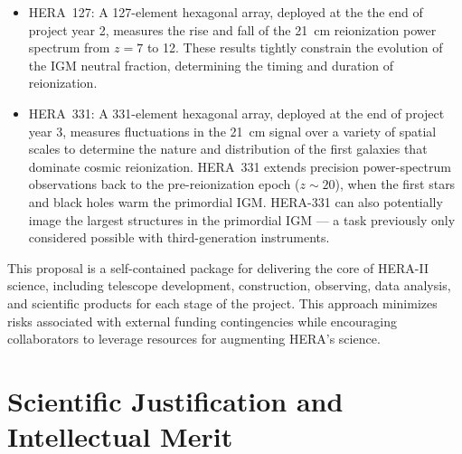 \documentclass[preprint]{aastex}
\newcommand{\compress}{\vspace{-0.25in}}
\begin{document}
\begin{itemize}[noitemsep,nolistsep]

\item HERA~127: A 127-element hexagonal array, deployed at the
the end of project year 2, measures the rise and fall of the
21~cm reionization power spectrum from $z = 7$ to 12. These results tightly
constrain the evolution of the IGM neutral fraction, determining
the timing and duration of reionization. %

\item HERA~331: A 331-element hexagonal array, deployed at the end of project year 3,
measures fluctuations in the 21~cm signal over a variety of spatial
scales to determine the nature and distribution of the first galaxies
that dominate cosmic reionization. HERA~331 extends precision
power-spectrum observations back to the pre-reionization epoch ($z \sim 20$), 
when the first stars and black holes warm the primordial IGM. HERA-331 can also potentially 
image the largest structures in the primordial
IGM --- a task previously only considered possible with third-generation
instruments. 

\end{itemize}

\noindent
This proposal is a self-contained package for delivering the core of HERA-II science,
including telescope development, construction, observing, data analysis,
and scientific products for each stage of the project.  
This approach minimizes
risks associated with external funding contingencies while encouraging
collaborators to leverage resources for augmenting HERA's science.





\compress
\section{Scientific Justification and Intellectual Merit} %
\end{document}

